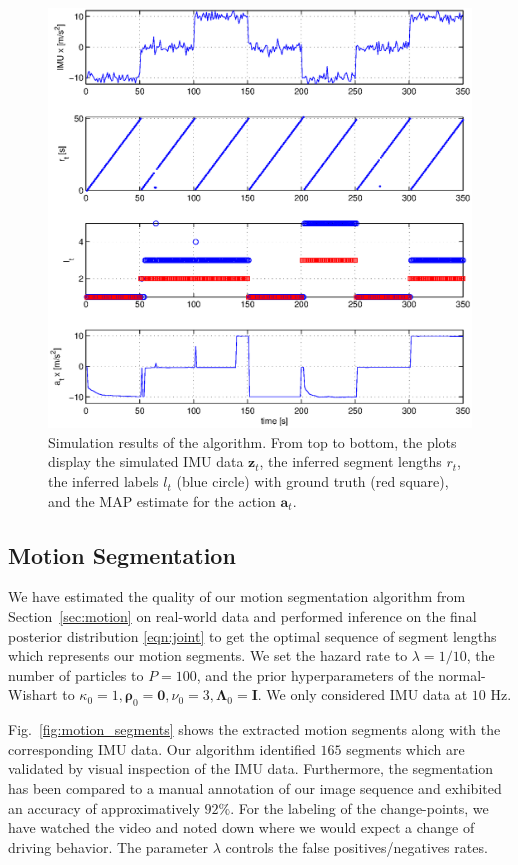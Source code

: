 \begin{figure}[t]
\centering
\includegraphics[width=0.8\columnwidth]{fig/simResult.eps}
\caption{Simulation results of the algorithm. From top to bottom, the
  plots display the simulated IMU data $\mathbf{z}_t$, the inferred
  segment lengths $r_t$, the inferred labels $l_t$ (blue circle) with
  ground truth (red square), and the MAP estimate for the action
  $\mathbf{a}_t$.\vspace{-5mm}}
\label{fig:simulation}
\end{figure}

\subsection{Motion Segmentation}
We have estimated the quality of our motion segmentation algorithm
from Section~\ref{sec:motion} on real-world data and performed inference on the
final posterior distribution \eqref{eqn:joint} to get the optimal
sequence of segment lengths which represents our motion segments. We set the
hazard rate to $\lambda=1/10$, the number of particles to $P=100$, and the prior
hyperparameters of the normal-Wishart to $\kappa_0=1,
\boldsymbol{\rho}_0=\mathbf{0},\nu_0=3,\boldsymbol{\Lambda}_0=\mathbf{I}$. We
only considered IMU data at $10$ Hz.

Fig.~\ref{fig:motion_segments} shows the extracted motion segments along with
the corresponding IMU data. Our algorithm identified $165$ segments which are
validated by visual inspection of the IMU data. Furthermore, the segmentation
has been compared to a manual annotation of our image sequence and exhibited an
accuracy of approximatively $92\%$. For the labeling of the change-points, we
have watched the video and noted down where we would expect a change of driving
behavior. The parameter $\lambda$ controls the false positives/negatives rates.

